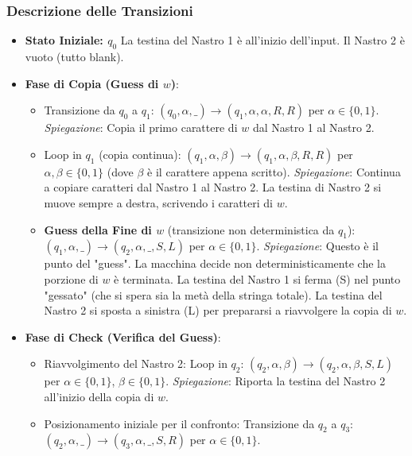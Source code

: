 \documentclass[a4paper]{article}
\begin{document}
\subsubsection{Descrizione delle Transizioni}
\begin{itemize}
    \item \textbf{Stato Iniziale: $q_0$}
        La testina del Nastro 1 è all'inizio dell'input. Il Nastro 2 è vuoto (tutto blank).
    \item \textbf{Fase di Copia (Guess di $w$)}:
        \begin{itemize}
            \item Transizione da $q_0$ a $q_1$:
                $(q_0, \alpha, \text{\_}) \to (q_1, \alpha, \alpha, R, R)$ per $\alpha \in \{0, 1\}$.
                \textit{Spiegazione}: Copia il primo carattere di $w$ dal Nastro 1 al Nastro 2.
            \item Loop in $q_1$ (copia continua):
                $(q_1, \alpha, \beta) \to (q_1, \alpha, \beta, R, R)$ per $\alpha, \beta \in \{0, 1\}$ (dove $\beta$ è il carattere appena scritto).
                \textit{Spiegazione}: Continua a copiare caratteri dal Nastro 1 al Nastro 2. La testina di Nastro 2 si muove sempre a destra, scrivendo i caratteri di $w$.
            \item \textbf{Guess della Fine di $w$} (transizione non deterministica da $q_1$):
                $(q_1, \alpha, \text{\_}) \to (q_2, \alpha, \text{\_}, S, L)$ per $\alpha \in \{0, 1\}$.
                \textit{Spiegazione}: Questo è il punto del "guess". La macchina decide non deterministicamente che la porzione di $w$ è terminata. La testina del Nastro 1 si ferma (S) nel punto "gessato" (che si spera sia la metà della stringa totale). La testina del Nastro 2 si sposta a sinistra (L) per prepararsi a riavvolgere la copia di $w$.
        \end{itemize}
    \item \textbf{Fase di Check (Verifica del Guess)}:
        \begin{itemize}
            \item Riavvolgimento del Nastro 2: Loop in $q_2$:
                $(q_2, \alpha, \beta) \to (q_2, \alpha, \beta, S, L)$ per $\alpha \in \{0, 1\}$, $\beta \in \{0, 1\}$.
                \textit{Spiegazione}: Riporta la testina del Nastro 2 all'inizio della copia di $w$.
            \item Posizionamento iniziale per il confronto: Transizione da $q_2$ a $q_3$:
                $(q_2, \alpha, \text{\_}) \to (q_3, \alpha, \text{\_}, S, R)$ per $\alpha \in \{0, 1\}$.

\end{itemize}
\end{itemize}
\end{document}
